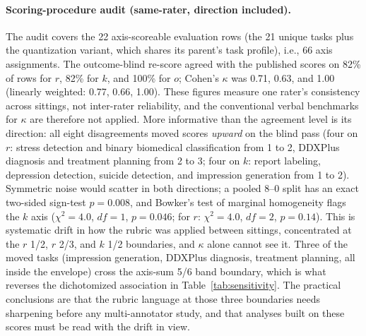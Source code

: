 \documentclass[11pt]{article}
\begin{document}
\paragraph{Scoring-procedure audit (same-rater, direction included).}
\label{sec:audit}
The audit covers the 22 axis-scoreable evaluation rows (the 21 unique tasks plus the quantization variant, which shares its parent's task profile), i.e., 66 axis assignments. The outcome-blind re-score agreed with the published scores on 82\% of rows for $r$, 82\% for $k$, and 100\% for $o$; Cohen's $\kappa$ was 0.71, 0.63, and 1.00 (linearly weighted: 0.77, 0.66, 1.00). These figures measure one rater's consistency across sittings, not inter-rater reliability, and the conventional verbal benchmarks for $\kappa$ are therefore not applied. More informative than the agreement level is its direction: all eight disagreements moved scores \emph{upward} on the blind pass (four on $r$: stress detection and binary biomedical classification from 1 to 2, DDXPlus diagnosis and treatment planning from 2 to 3; four on $k$: report labeling, depression detection, suicide detection, and impression generation from 1 to 2). Symmetric noise would scatter in both directions; a pooled 8--0 split has an exact two-sided sign-test $p = 0.008$, and Bowker's test of marginal homogeneity \cite{Bowker1948} flags the $k$ axis ($\chi^2 = 4.0$, $df = 1$, $p = 0.046$; for $r$: $\chi^2 = 4.0$, $df = 2$, $p = 0.14$). This is systematic drift in how the rubric was applied between sittings, concentrated at the $r$ 1/2, $r$ 2/3, and $k$ 1/2 boundaries, and $\kappa$ alone cannot see it. Three of the moved tasks (impression generation, DDXPlus diagnosis, treatment planning, all inside the envelope) cross the axis-sum 5/6 band boundary, which is what reverses the dichotomized association in Table~\ref{tab:sensitivity}. The practical conclusions are that the rubric language at those three boundaries needs sharpening before any multi-annotator study, and that analyses built on these scores must be read with the drift in view.
\end{document}
